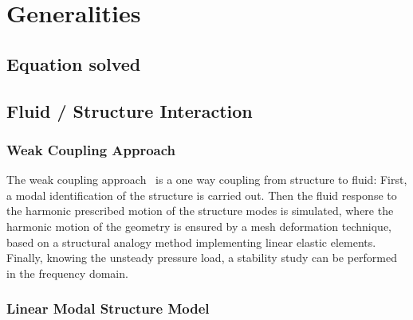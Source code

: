 \chapter{Generalities}
\label{generalities}


\section{Equation solved} %
\label{sec:equation_solved}

\section{Fluid / Structure Interaction}

\subsection{Weak Coupling Approach}

The weak coupling approach~\cite{Rougeault2003} is a one way
  coupling from structure to fluid: First, a modal identification
of the structure is carried out. Then the fluid response to the
harmonic prescribed motion of the structure modes is simulated,
where the harmonic motion of the geometry is ensured by a mesh
deformation technique, based on a structural analogy method
implementing linear elastic elements. Finally, knowing the unsteady
pressure load, a stability study can be performed in the frequency
domain.

\subsection{Linear Modal Structure Model}

